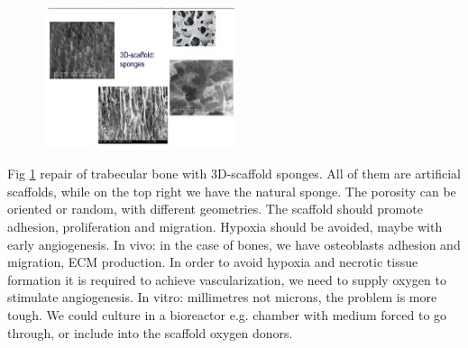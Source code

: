 \begin{figure}[h]
\centering
\includegraphics[width=0.5\textwidth]{sponge.jpg}
\caption{\label{fig:sponge}}
\end{figure}
\noindent
Fig \ref{fig:sponge} repair of trabecular bone with 3D-scaffold sponges.
All of them are artificial scaffolds, while on the top right we have the natural sponge.
The porosity can be oriented or random, with different geometries.
The scaffold should promote adhesion, proliferation and migration. Hypoxia should be avoided, maybe with early angiogenesis.
In vivo: in the case of bones, we have osteoblasts adhesion and migration, ECM production. In order to avoid hypoxia and necrotic tissue formation it is required to achieve vascularization, we need to supply oxygen to stimulate angiogenesis.
In vitro: millimetres not microns, the problem is more tough. We could culture in a bioreactor e.g. chamber with medium forced to go through, or include into the scaffold oxygen donors.

